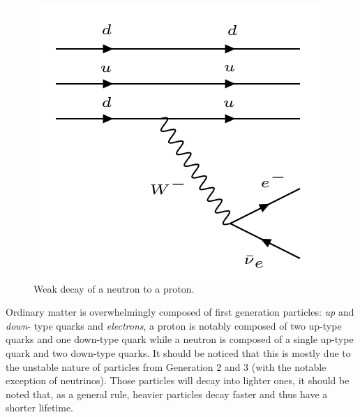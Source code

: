 \begin{figure}[htbp]
\centering
\includegraphics[width=0.5\linewidth]{./fig/betadecay.png}
\caption{Weak decay of a neutron to a proton.}
\label{fig:betadecay}
\end{figure}

Ordinary matter is overwhelmingly composed of first generation particles: \textit{up} and \textit{down}- type quarks and \textit{electrons}, a proton is notably composed of two up-type quarks and one down-type quark while a neutron is composed of a single up-type quark and two down-type quarks. It should be noticed that this is mostly due to the unstable nature of particles from Generation 2 and 3 (with the notable exception of neutrinos). Those particles will decay into lighter ones, it should be noted that, as a general rule, heavier particles decay faster and thus have a shorter lifetime. 

